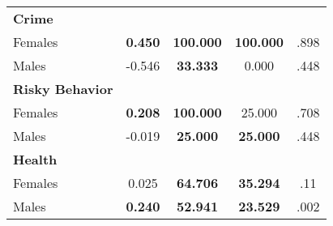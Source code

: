 \begin{tabular}{l c c c c}
\midrule
\textbf{Crime} & & & & \\
\quad Females &  \textbf{    0.450} & \textbf{  100.000} & \textbf{  100.000} & .898 \\
\quad Males &     -0.546 & \textbf{   33.333} &     0.000 & .448 \\
\midrule
\textbf{Risky Behavior} & & & & \\
\quad Females &  \textbf{    0.208} & \textbf{  100.000} &    25.000 & .708 \\
\quad Males &     -0.019 & \textbf{   25.000} & \textbf{   25.000} & .448 \\
\midrule
\textbf{Health} & & & & \\
\quad Females &      0.025 & \textbf{   64.706} & \textbf{   35.294} & .11 \\
\quad Males &  \textbf{    0.240} & \textbf{   52.941} & \textbf{   23.529} & .002 \\
\bottomrule
\end{tabular}
